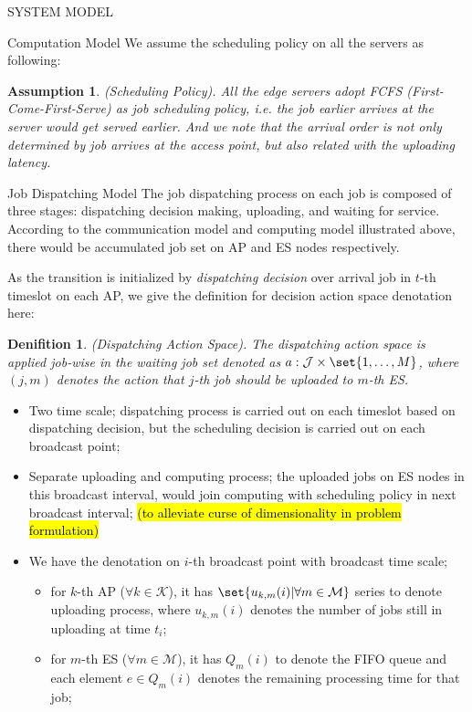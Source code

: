 \documentclass[10pt, conference, letterpaper]{IEEEtran}
\newtheorem{definition}{Denifition}
\newtheorem{assumption}{Assumption}
\DeclarePairedDelimiter\set\{\}
\newcommand{\apSet}{\mathcal{K}}
\newcommand{\esSet}{\mathcal{M}}
\newcommand{\jSet}{\mathcal{J}}
\begin{document}
\begin{section}{SYSTEM MODEL}
\begin{subsection}{Computation Model}
            We assume the scheduling policy on all the servers as following:
            \begin{assumption}
                (Scheduling Policy).
                All the edge servers adopt \emph{FCFS} (First-Come-First-Serve) as job scheduling policy, i.e. the job earlier arrives at the server would get served earlier. And we note that the arrival order is not only determined by job arrives at the access point, but also related with the uploading latency.
            \end{assumption}
        \end{subsection}

        \begin{subsection}{Job Dispatching Model}
            The job dispatching process on each job is composed of three stages: dispatching decision making, uploading, and waiting for service. According to the communication model and computing model illustrated above, there would be accumulated job set on AP and ES nodes respectively.

            As the transition is initialized by \emph{dispatching decision} over arrival job in $t$-th timeslot on each AP, we give the definition for decision action space denotation here:
            \begin{definition}
                (Dispatching Action Space).
                The dispatching action space is applied job-wise in the waiting job set denoted as $a: \jSet \times \set{1,\dots,M}$, where $(j, m)$ denotes the action that $j$-th job should be uploaded to $m$-th ES.
            \end{definition}

            \begin{itemize}
                \item Two time scale; dispatching process is carried out on each timeslot based on dispatching decision, but the scheduling decision is carried out on each broadcast point;
                \item Separate uploading and computing process; the uploaded jobs on ES nodes in this broadcast interval, would join computing with scheduling policy in next broadcast interval; \hl{(to alleviate curse of dimensionality in problem formulation)}
                \item We have the denotation on $i$-th broadcast point with broadcast time scale;
                    \begin{itemize}
                        \item for $k$-th AP ($\forall k\in\apSet$), it has $\set{u_{k,m}(i)|\forall m\in\esSet}$ series to denote uploading process, where $u_{k,m}(i)$ denotes the number of jobs still in uploading at time $t_i$;
                        \item for $m$-th ES ($\forall m\in\esSet$), it has $Q_m(i)$ to denote the FIFO queue and each element $e \in Q_m(i)$ denotes the remaining processing time for that job;
                    \end{itemize}
            \end{itemize}


\end{subsection}
\end{section}
\end{document}
